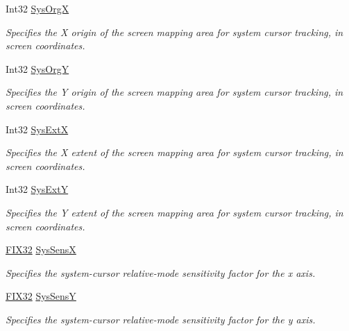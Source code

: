 \begin{DoxyCompactItemize}
Int32 \mbox{\hyperlink{class_wintab_d_n_1_1_c_wintab_context_a14ba5470dacaafe10618a3d4cd0931bd}{Sys\+OrgX}}
\begin{DoxyCompactList}\small\item\em Specifies the X origin of the screen mapping area for system cursor tracking, in screen coordinates. \end{DoxyCompactList}\item 
Int32 \mbox{\hyperlink{class_wintab_d_n_1_1_c_wintab_context_ab630649b89e1029b4ded69f815cf9947}{Sys\+OrgY}}
\begin{DoxyCompactList}\small\item\em Specifies the Y origin of the screen mapping area for system cursor tracking, in screen coordinates. \end{DoxyCompactList}\item 
Int32 \mbox{\hyperlink{class_wintab_d_n_1_1_c_wintab_context_af7bb13537c0ce3d915309bcc4de86bb3}{Sys\+ExtX}}
\begin{DoxyCompactList}\small\item\em Specifies the X extent of the screen mapping area for system cursor tracking, in screen coordinates. \end{DoxyCompactList}\item 
Int32 \mbox{\hyperlink{class_wintab_d_n_1_1_c_wintab_context_abcafe640181563d36f23c87433f485a5}{Sys\+ExtY}}
\begin{DoxyCompactList}\small\item\em Specifies the Y extent of the screen mapping area for system cursor tracking, in screen coordinates. \end{DoxyCompactList}\item 
\mbox{\hyperlink{class_wintab_d_n_1_1_f_i_x32}{F\+I\+X32}} \mbox{\hyperlink{class_wintab_d_n_1_1_c_wintab_context_ae4188eab9083490c471951381961d6a8}{Sys\+SensX}}
\begin{DoxyCompactList}\small\item\em Specifies the system-\/cursor relative-\/mode sensitivity factor for the x axis. \end{DoxyCompactList}\item 
\mbox{\hyperlink{class_wintab_d_n_1_1_f_i_x32}{F\+I\+X32}} \mbox{\hyperlink{class_wintab_d_n_1_1_c_wintab_context_ab1c31c691d5659eb3bde3c999b62d5b6}{Sys\+SensY}}
\begin{DoxyCompactList}\small\item\em Specifies the system-\/cursor relative-\/mode sensitivity factor for the y axis. \end{DoxyCompactList}\end{DoxyCompactItemize}
